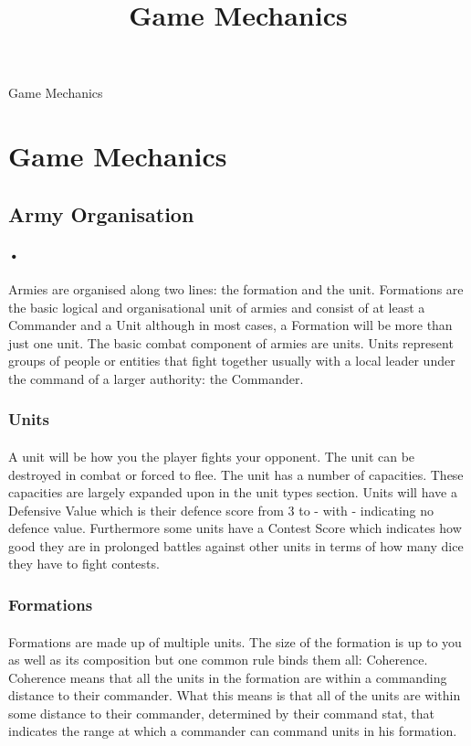 \documentclass[12pt]{article}
\begin{document}
\begin{titlepage}
\begin{huge}
\begin{center}
\title{Game Mechanics}
Game Mechanics
\end{center}
\end{huge}
\end{titlepage}
\pagebreak
\section{Game Mechanics}
\subsection{Army Organisation}
\paragraph{•}
Armies are organised along two lines: the formation and the unit. Formations are the basic logical and organisational unit of armies and consist of at least a Commander and a Unit although in most cases, a Formation will be more than just one unit. The basic combat component of armies are units. Units represent groups of people or entities that fight together usually with a local leader under the command of a larger authority: the Commander.
\subsubsection{Units}
\paragraph{}A unit will be how you the player fights your opponent. The unit can be destroyed in combat or forced to flee. The unit has a number of capacities. These capacities are largely expanded upon in the unit types section. Units will have a Defensive Value which is their defence score from 3 to - with - indicating no defence value. Furthermore some units have a Contest Score which indicates how good they are in prolonged battles against other units in terms of how many dice they have to fight contests. 
\subsubsection{Formations}
\paragraph{}
Formations are made up of multiple units. The size of the formation is up to you as well as its composition but one common rule binds them all: Coherence. Coherence means that all the units in the formation are within a commanding distance to their commander. What this means is that all of the units are within some distance to their commander, determined by their command stat, that indicates the range at which a commander can command units in his formation.
\end{document}
